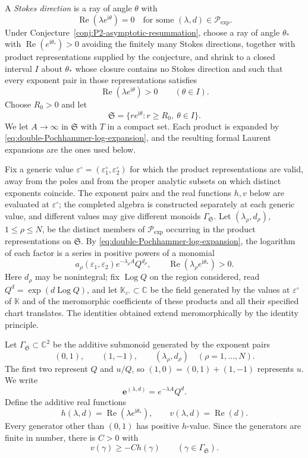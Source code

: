 \documentclass{amsart}
\theoremstyle{definition}
\numberwithin{equation}{section}
\newcommand{\C}{\mathbb C}
\newcommand{\K}{\mathbb K}
\newcommand{\eps}{\varepsilon}
\begin{document}
A \emph{Stokes direction} is a ray of angle \(\theta\) with
\[
 \operatorname{Re}(\lambda e^{\mathrm{i}\theta})=0
 \quad\text{for some }(\lambda,d)\in\mathcal P_{\mathrm{exp}}.
\]
Under Conjecture~\ref{conj:P2-asymptotic-resummation}, choose a ray of angle \(\theta_*\) with \(\operatorname{Re}(e^{\mathrm{i}\theta_*})>0\) avoiding the finitely many Stokes directions, together with product representations supplied by the conjecture, and shrink to a closed interval \(I\) about \(\theta_*\) whose closure contains no Stokes direction and such that every exponent pair in those representations satisfies
\[
 \operatorname{Re}(\lambda e^{\mathrm{i}\theta})>0
 \qquad(\theta\in I).
\]
Choose \(R_0>0\) and let
\[
 \mathfrak S=\{re^{\mathrm{i}\theta}:r\geq R_0,\ \theta\in I\}.
\]
We let \(A\to\infty\) in \(\mathfrak S\) with \(T\) in a compact set.  Each product is expanded by \eqref{eq:double-Pochhammer-log-expansion}, and the resulting formal Laurent expansions are the ones used below.

Fix a generic value \(\eps^\circ=(\eps_1^\circ,\eps_2^\circ)\) for which the product representations are valid, away from the poles and from the proper analytic subsets on which distinct exponents coincide.  The exponent pairs and the real functions \(h,v\) below are evaluated at \(\eps^\circ\); the completed algebra is constructed separately at each generic value, and different values may give different monoids \(\Gamma_{\mathfrak S}\).  Let \((\lambda_\rho,d_\rho)\), \(1\leq\rho\leq N\), be the distinct members of \(\mathcal P_{\mathrm{exp}}\) occurring in the product representations on \(\mathfrak S\).  By \eqref{eq:double-Pochhammer-log-expansion}, the logarithm of each factor is a series in positive powers of a monomial
\begin{equation}
 a_\rho(\eps_1,\eps_2)e^{-\lambda_\rho A}Q^{d_\rho},
 \qquad
 \operatorname{Re}(\lambda_\rho e^{\mathrm{i}\theta_*})>0.
\label{eq:modular-factor-monomial}
\end{equation}
Here \(d_\rho\) may be nonintegral; fix \(\operatorname{Log}Q\) on the region considered, read \(Q^d=\exp(d\operatorname{Log}Q)\), and let \(\K_{\eps^\circ}\subset\C\) be the field generated by the values at \(\eps^\circ\) of \(\K\) and of the meromorphic coefficients of these products and all their specified chart translates.  The identities obtained extend meromorphically by the identity principle.

Let \(\Gamma_{\mathfrak S}\subset\C^2\) be the additive submonoid generated by the exponent pairs
\[
 (0,1),\qquad (1,-1),\qquad
 (\lambda_\rho,d_\rho)\quad(\rho=1,\ldots,N).
\]
The first two represent \(Q\) and \(u/Q\), so \((1,0)=(0,1)+(1,-1)\) represents \(u\).  We write
\[
 \mathbf e^{(\lambda,d)}=e^{-\lambda A}Q^d.
\]
Define the additive real functions
\[
h(\lambda,d)=\operatorname{Re}(\lambda e^{\mathrm{i}\theta_*}),
 \qquad v(\lambda,d)=\operatorname{Re}(d).
\]  Every generator other than \((0,1)\) has positive \(h\)-value.  Since the generators are finite in number, there is \(C>0\) with
\begin{equation}
 v(\gamma)\geq-Ch(\gamma)
 \qquad(\gamma\in\Gamma_{\mathfrak S}).
\label{eq:semigroup-cone-bound}
\end{equation}
\end{document}
